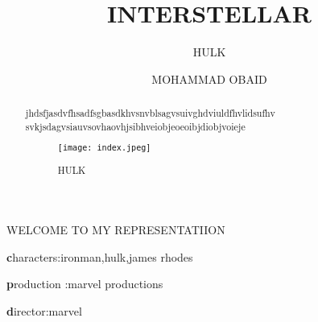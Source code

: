 \documentclass{beamer}
\title{\color{blue}INTERSTELLAR}
\subtitle{HULK}
\author{ MOHAMMAD OBAID}
\institute{\color{red}INTERSTELLAR}
\begin{document}
\begin{frame}{WELCOME TO MY REPRESENTATIION}
  \titlepage
  \end{frame}
  \begin{abstract}
      jhdsfjasdvfhsadfsgbasdkhvsnvblsagvsuivghdviuldfhvlidsufhv
      svkjsdagvsiauvsovhaovhjsibhveiobjeoeoibjdiobjvoieje
      \centering
      \begin{figure}
          \centering
          \texttt{[image: index.jpeg]}
          \caption{HULK}
          
      \end{figure}
  \end{abstract}
  \begin{frame}
    \begin{itemsize}
      \item{\textbf characters}:ironman,hulk,james rhodes
      \item{\textbf production }:marvel productions
      \item{\textbf director}:marvel
    \end{itemsize}
      
  \end{frame}
\end{document}
